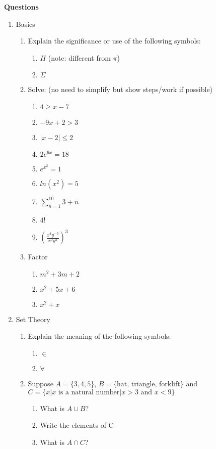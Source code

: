 \documentclass[10pt]{article}
\begin{document}
\noindent \textbf{Questions}
\begin{enumerate}
\item Basics
\begin{enumerate}
\item Explain the significance or use of the following symbols:
\begin{enumerate} 
\item $\Pi$ (note: different from $\pi$)
\item $\Sigma$
\end{enumerate}


\item Solve: (no need to simplify but show steps/work if possible)
\begin{enumerate}
\item $4\geq x-7$ \\
\item $-9x+2>3$ \\
\item $|x-2|\leq2$ \\
\item $2e^{6x}=18$ \\
\item $e^{x^2}=1$ \\
\item $ln(x^2)=5$ \\
\item $\sum_{n=1}^{10} 3+n $\\
\item $4!$ \\
\item $(\frac{x^4y^{-3}}{x^2y^3})^3$ \\
\end{enumerate}

\item Factor
\begin{enumerate}
\item $m^2+3m+2 $
\item $x^2+5x+6$
\item $x^2+x$
\end{enumerate}

\end{enumerate}

\item Set Theory
\begin{enumerate}
\item Explain the meaning of the following symbols:
\begin{enumerate}
\item $\in$
\item $\forall$
\end{enumerate}
\item Suppose $A=\{3, 4, 5\}$,  $B=\{\text{hat, triangle, forklift}\}$ and $C=\{x| x\text{ is a natural number}| x >3 \text{ and } x<9\}$
\begin{enumerate}
\item What is $A \cup B$?
\item Write the elements of C
\item What is $A \cap C$?
\end{enumerate}
\end{enumerate}




\end{enumerate}
\end{document}

